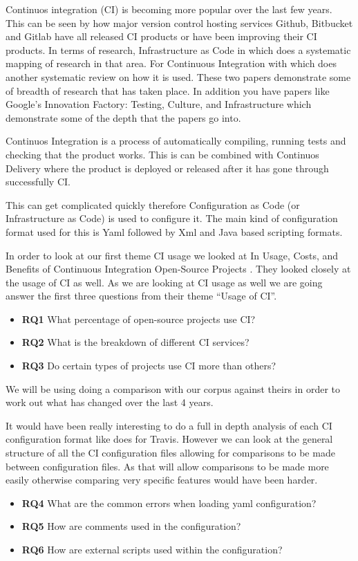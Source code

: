 \documentclass[10pt,conference]{IEEEtran}
\begin{document}
Continuos integration (CI) is becoming more popular over the last few years. This can be seen by how major version control hosting services Github, Bitbucket and Gitlab have all released CI products or have been improving their CI products. In terms of research, Infrastructure as Code in \citet{Rahman2019} which does a systematic mapping of research in that area. For Continuous Integration with \citet{Shahin2017} which does another systematic review on how it is used. These two papers demonstrate some of breadth of research that has taken place. In addition you have papers like Google's Innovation Factory: Testing, Culture, and Infrastructure \citet{Copeland2010} which demonstrate some of the depth that the papers go into.

Continuos Integration is a process of automatically compiling, running tests and checking that the product works. This is can be combined with Continuos Delivery where the product is deployed or released after it has gone through successfully CI. 

This can get complicated quickly therefore Configuration as Code (or Infrastructure as Code) is used to configure it. The main kind of configuration format used for this is Yaml followed by Xml and Java based scripting formats.


In order to look at our first theme CI usage we looked at In Usage, Costs, and Benefits of Continuous Integration Open-Source Projects \cite{Hilton2016}. They looked closely at the usage of CI as well. As we are looking at CI usage as well we are going answer the first three questions from their theme \enquote{Usage of CI}. 
\begin{itemize}
  \item \textbf{RQ1} What percentage of open-source projects use CI?
  \item \textbf{RQ2} What is the breakdown of different CI services?
  \item \textbf{RQ3} Do certain types of projects use CI more than others?
\end{itemize}

We will be using doing a comparison with our corpus against theirs in order to work out what has changed over the last 4 years. 

It would have been really interesting to do a full in depth analysis of each CI configuration format like \citet{Gallaba2018} does for Travis. However we can look at the general structure of all the CI configuration files allowing for comparisons to be made between configuration files. As that will allow comparisons to be made more easily otherwise comparing very specific features would have been harder.
\begin{itemize}
  \item \textbf{RQ4} What are the common errors when loading yaml configuration?
  \item \textbf{RQ5} How are comments used in the configuration?
  \item \textbf{RQ6} How are external scripts used within the configuration?
\end{itemize}
\end{document}
